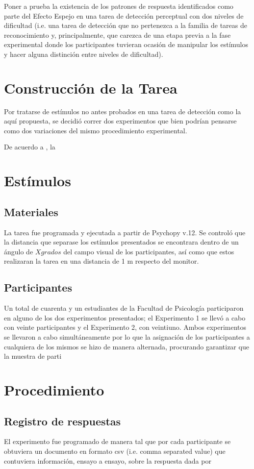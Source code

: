 Poner a prueba la existencia de los patrones de respuesta identificados como parte del Efecto Espejo en una tarea de detección perceptual con dos niveles de dificultad (i.e. una tarea de detección que no pertenezca a la familia de tareas de reconocimiento y, principalmente, que carezca de una etapa previa a la fase experimental donde los participantes tuvieran ocasión de manipular los estímulos y hacer alguna distinción entre niveles de dificultad).


\section{Construcción de la Tarea}

Por tratarse de estímulos no antes probados en una tarea de detección como la aquí propuesta, se decidió correr dos experimentos que bien podrían pensarse como dos variaciones del mismo procedimiento experimental. 

De acuerdo a \parencite{Massaro1971}, la 

\section{Estímulos}

\subsection{Materiales}
La tarea fue programada y ejecutada a partir de Psychopy v.12. Se controló que la distancia que separase los estímulos presentados se encontrara dentro de un ángulo de $X grados$ del campo visual de los participantes, así como que estos realizaran la tarea en una distancia de 1 m respecto del monitor.

\subsection{Participantes}

Un total de cuarenta y un estudiantes de la Facultad de Psicología participaron en alguno de los dos experimentos presentados; el Experimento 1 se llevó a cabo con veinte participantes y el Experimento 2, con veintiuno. Ambos experimentos se llevaron a cabo simultáneamente por lo que la asignación de los participantes a cualquiera de los mismos se hizo de manera alternada, procurando garantizar que la muestra de parti

\section{Procedimiento}



\subsection{Registro de respuestas}

El experimento fue programado de manera tal que por cada participante se obtuviera un documento en formato csv (i.e. comma separated value) que contuviera información, ensayo a ensayo, sobre la respuesta dada por 
